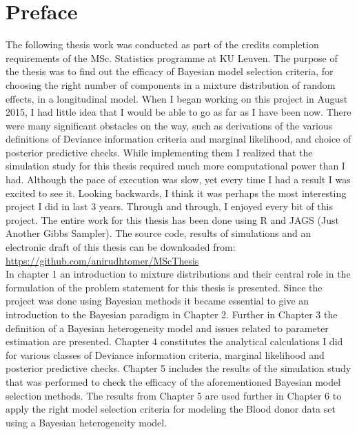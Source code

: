 \chapter{Preface}
\label{ch : preface}

The following thesis work was conducted as part of the credits completion requirements of the MSc. Statistics programme at KU Leuven. The purpose of the thesis was to find out the efficacy of Bayesian model selection criteria, for choosing the right number of components in a mixture distribution of random effects, in a longitudinal model. When I began working on this project in August 2015, I had little idea that I would be able to go as far as I have been now. There were many significant obstacles on the way, such as derivations of the various definitions of Deviance information criteria and marginal likelihood, and choice of posterior predictive checks. While implementing them I realized that the simulation study for this thesis required much more computational power than I had. Although the pace of execution was slow, yet every time I had a result I was excited to see it. Looking backwards, I think it was perhaps the most interesting project I did in last 3 years. Through and through, I enjoyed every bit of this project. The entire work for this thesis has been done using R and JAGS (Just Another Gibbs Sampler). The source code, results of simulations and an electronic draft of this thesis can be downloaded from:\\
\url{https://github.com/anirudhtomer/MScThesis}\\

In chapter 1 an introduction to mixture distributions and their central role in the formulation of the problem statement for this thesis is presented. Since the project was done using Bayesian methods it became essential to give an introduction to the Bayesian paradigm in Chapter 2. Further in Chapter 3 the definition of a Bayesian heterogeneity model and issues related to parameter estimation are presented. Chapter 4 constitutes the analytical calculations I did for various classes of Deviance information criteria, marginal likelihood and posterior predictive checks. Chapter 5 includes the results of the simulation study that was performed to check the efficacy of the aforementioned Bayesian model selection methods. The results from Chapter 5 are used further in Chapter 6 to apply the right model selection criteria for modeling the Blood donor data set \citep{nasserinejad_prevalence_2015} using a Bayesian heterogeneity model.\\

